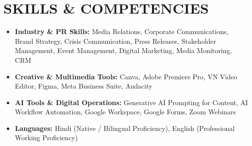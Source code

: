 \documentclass[10pt,a4paper]{article}
\begin{document}
\section{SKILLS \& COMPETENCIES}
\begin{itemize}[leftmargin=0pt, label={}, itemsep=2pt, parsep=0pt, topsep=2pt]
  \item \small{\textbf{Industry \& PR Skills:} Media Relations, Corporate Communications, Brand Strategy, Crisis Communication, Press Releases, Stakeholder Management, Event Management, Digital Marketing, Media Monitoring, CRM}
  \item \small{\textbf{Creative \& Multimedia Tools:} Canva, Adobe Premiere Pro, VN Video Editor, Figma, Meta Business Suite, Audacity}
  \item \small{\textbf{AI Tools \& Digital Operations:} Generative AI Prompting for Content, AI Workflow Automation, Google Workspace, Google Forms, Zoom Webinars}
  \item \small{\textbf{Languages:} Hindi (Native / Bilingual Proficiency), English (Professional Working Proficiency)}
\end{itemize}
\end{document}
